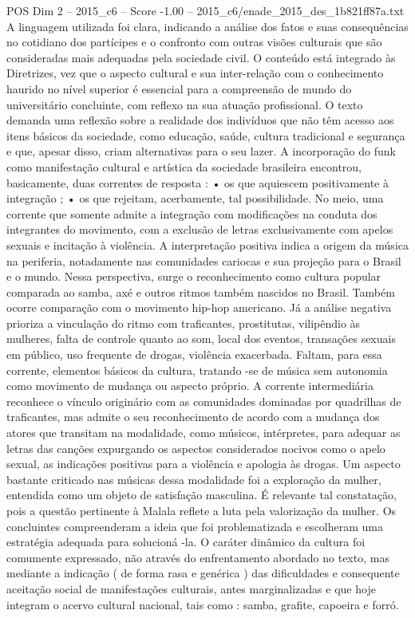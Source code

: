 \begin{textsample}{POS Dim 2 – 2015\_c6 – Score -1.00 – 2015\_c6/enade\_2015\_des\_1b821ff87a.txt}
A linguagem utilizada foi clara, indicando a análise dos fatos e suas consequências no cotidiano dos partícipes e o confronto com outras visões culturais que são consideradas mais adequadas pela sociedade civil.
O conteúdo está integrado às Diretrizes, vez que o aspecto cultural e sua inter-relação com o conhecimento haurido no nível superior é essencial para a compreensão de mundo do universitário concluinte, com reflexo na sua atuação profissional.
O texto demanda uma reflexão sobre a realidade dos indivíduos que não têm acesso aos itens básicos da sociedade, como educação, saúde, cultura tradicional e segurança e que, apesar disso, criam alternativas para o seu lazer.
A incorporação do funk como manifestação cultural e artística da sociedade brasileira encontrou, basicamente, duas correntes de resposta : • os que aquiescem positivamente à integração ; • os que rejeitam, acerbamente, tal possibilidade.
No meio, uma corrente que somente admite a integração com modificações na conduta dos integrantes do movimento, com a exclusão de letras exclusivamente com apelos sexuais e incitação à violência.
A interpretação positiva indica a origem da música na periferia, notadamente nas comunidades cariocas e sua projeção para o Brasil e o mundo.
Nessa perspectiva, surge o reconhecimento como cultura popular comparada ao samba, axé e outros ritmos também nascidos no Brasil.
Também ocorre comparação com o movimento hip-hop americano.
Já a análise negativa prioriza a vinculação do ritmo com traficantes, prostitutas, vilipêndio às mulheres, falta de controle quanto ao som, local dos eventos, transações sexuais em público, uso frequente de drogas, violência exacerbada.
Faltam, para essa corrente, elementos básicos da cultura, tratando -se de música sem autonomia como movimento de mudança ou aspecto próprio.
A corrente intermediária reconhece o vínculo originário com as comunidades dominadas por quadrilhas de traficantes, mas admite o seu reconhecimento de acordo com a mudança dos atores que transitam na modalidade, como músicos, intérpretes, para adequar as letras das canções expurgando os aspectos considerados nocivos como o apelo sexual, as indicações positivas para a violência e apologia às drogas.
Um aspecto bastante criticado nas músicas dessa modalidade foi a exploração da mulher, entendida como um objeto de satisfação masculina.
É relevante tal constatação, pois a questão pertinente à Malala reflete a luta pela valorização da mulher.
Os concluintes compreenderam a ideia que foi problematizada e escolheram uma estratégia adequada para solucioná -la.
O caráter dinâmico da cultura foi comumente expressado, não através do enfrentamento abordado no texto, mas mediante a indicação ( de forma rasa e genérica ) das dificuldades e consequente aceitação social de manifestações culturais, antes marginalizadas e que hoje integram o acervo cultural nacional, tais como : samba, grafite, capoeira e forró.

\end{textsample}
